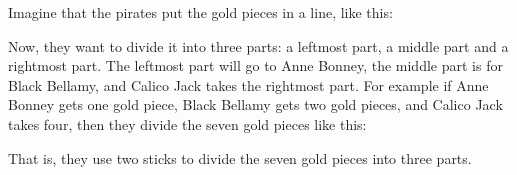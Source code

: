 Imagine that the pirates put the gold pieces in a line, like this: 
\begin{center}
\end{center}
Now, they want to divide it into three parts: 
a leftmost part, a middle part and a rightmost part. 
The leftmost part will go to Anne Bonney, the middle part is for Black Bellamy, 
and Calico Jack takes the rightmost part. 
For example if Anne Bonney gets one gold piece, Black Bellamy gets two gold pieces, 
and Calico Jack takes four, then they divide the seven gold pieces like this: 
\begin{center}
\end{center}
That is, they use two sticks to divide the seven gold pieces into three parts. 

